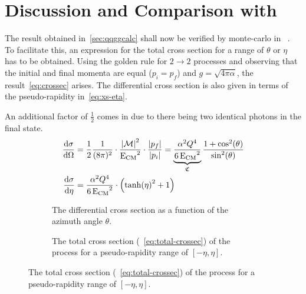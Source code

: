 
\section{Discussion and Comparison with \sherpa}%
\label{sec:compsher}

The result obtained in~\ref{sec:qqggcalc} shall now be verified by
monte-carlo in \sherpa{}~\cite{Gleisberg:2008ta}. To facilitate this, an
expression for the total cross section for a range of \(\theta\) or
\(\eta\) has to be obtained. Using the golden rule for
\(2\rightarrow 2\) processes and observing that the initial and final
momenta are equal (\(p_i=p_f\)) and \(g=\sqrt{4\pi\alpha}\), the
result~\eqref{eq:crossec} arises. The differential cross section is
also given in terms of the pseudo-rapidity in~\ref{eq:xs-eta}.

An additional factor of \(\frac{1}{2}\) comes in due to there being
two identical photons in the final state.
\begin{align}
  \dv{\sigma}{\Omega} &=
                        \frac{1}{2}\frac{1}{(8\pi)^2}\cdot\frac{\abs{\mathcal{M}}^2}{\operatorname{E_{\text{CM}}}^2}\cdot\frac{\abs{p_f}}{\abs{p_i}}
                        =
                        \underbrace{\frac{\alpha^2Q^4}{6\operatorname{E_{\text{CM}}}^2}}_{\mathfrak{C}}\frac{1+\cos^2(\theta)}{\sin^2(\theta)}\label{eq:crossec}
  \\
  \dv{\sigma}{\eta} &= \frac{\alpha^2Q^4}{6\operatorname{E_{\text{CM}}}^2}\cdot\qty(\tanh(\eta)^2 + 1)\label{eq:xs-eta}
\end{align}

\begin{figure}[ht]
  \centering
  \begin{subfigure}[c]{.45\textwidth}
    \centering {}
    \caption[Plot of the differential cross section of the \(\qqgg\)
    process.]{\label{fig:diffxs} The differential cross section as a
      function of the azimuth angle \(\theta\). }
  \end{subfigure}
  \begin{subfigure}[c]{.45\textwidth}
  \centering
  \caption[Plot of the total cross section of the \(\qqgg\)
  process.]{\label{fig:totxs} The total cross section
    (~\ref{eq:total-crossec}) of the process for a pseudo-rapidity
    range of \([-\eta, \eta]\).}
  \end{subfigure}
\end{figure}

